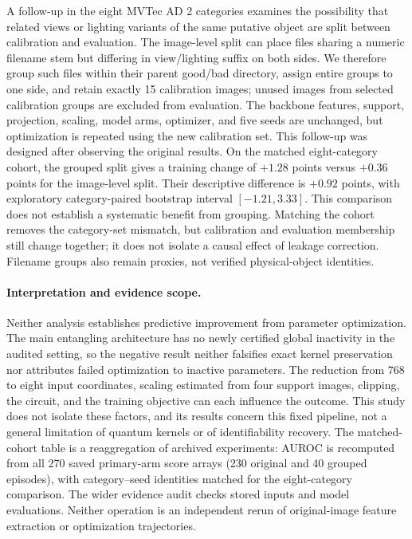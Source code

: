 A follow-up in the eight MVTec AD 2 categories examines the possibility
that related views or lighting variants of the same putative object
are split between calibration and evaluation. The image-level split
can place files sharing a numeric filename stem but differing in
view/lighting suffix on both sides. We therefore group such files
within their parent good/bad directory, assign entire groups to one
side, and retain exactly 15 calibration images; unused images from
selected calibration groups are excluded from evaluation.
The backbone features, support, projection, scaling, model arms,
optimizer, and five seeds are unchanged, but optimization is repeated
using the new calibration set. This follow-up was designed after
observing the original results. On the matched eight-category cohort,
the grouped split gives a training change of $+1.28$ points versus
$+0.36$ points for the image-level split. Their descriptive difference
is $+0.92$ points, with exploratory category-paired bootstrap interval
$[-1.21,3.33]$. This comparison does not establish a systematic
benefit from grouping. Matching the cohort removes the category-set
mismatch, but calibration and evaluation membership still change
together; it does not isolate a causal effect of leakage correction.
Filename groups also remain proxies, not verified physical-object
identities.

\paragraph{Interpretation and evidence scope.}
Neither analysis establishes predictive improvement from parameter
optimization. The main entangling architecture has no newly certified
global inactivity in the audited setting, so the negative result
neither falsifies exact kernel preservation nor attributes failed
optimization to inactive parameters. The reduction from 768 to eight
input coordinates, scaling estimated from four support images,
clipping, the circuit, and the training objective can each influence
the outcome. This study does not isolate these factors, and its
results concern this fixed pipeline, not a general limitation of
quantum kernels or of identifiability recovery. The matched-cohort
table is a reaggregation of archived experiments: AUROC is recomputed
from all 270 saved primary-arm score arrays (230 original and 40
grouped episodes), with category--seed identities matched for the
eight-category comparison. The wider evidence audit checks stored
inputs and model evaluations. Neither operation is an independent
rerun of original-image feature extraction or optimization trajectories.

